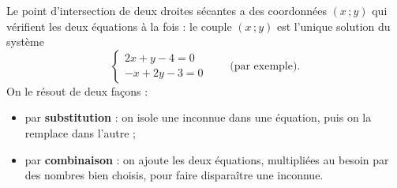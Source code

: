 \documentclass[11pt,a4paper]{article}
\begin{document}
\begin{remarquebox}
Le point d'intersection de deux droites sécantes a des coordonnées $(x\,;y)$ qui vérifient
les deux équations à la fois : le couple $(x\,;y)$ est l'unique solution du système
\[
  \left\{\begin{array}{l}
  2x+y-4=0\\
  -x+2y-3=0
  \end{array}\right.
  \qquad\text{(par exemple).}
\]
On le résout de deux façons :
\begin{itemize}
  \item par \textbf{substitution} : on isole une inconnue dans une équation, puis on la
        remplace dans l'autre ;
  \item par \textbf{combinaison} : on ajoute les deux équations, multipliées au besoin par
        des nombres bien choisis, pour faire disparaître une inconnue.
\end{itemize}
\end{remarquebox}
\end{document}
